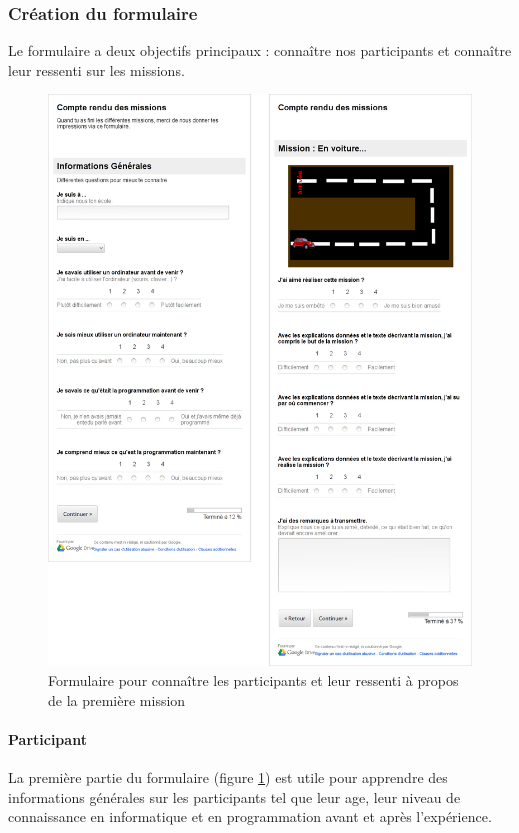 \subsubsection{Création du formulaire}
Le formulaire a deux objectifs principaux : connaître nos participants et connaître leur ressenti sur les missions.
\begin{figure}%
  \begin{center}
    \includegraphics[width=\textwidth]{content/8-validation/images/form}
    \caption{Formulaire pour connaître les participants et leur ressenti à propos de la première mission}
    \label{fig:form-user}
  \end{center}
\end{figure}

\paragraph{Participant}
La première partie du formulaire (figure \ref{fig:form-user}) est utile pour apprendre des informations générales sur les participants tel que leur age, leur niveau de connaissance en informatique et en programmation avant et après l'expérience.

